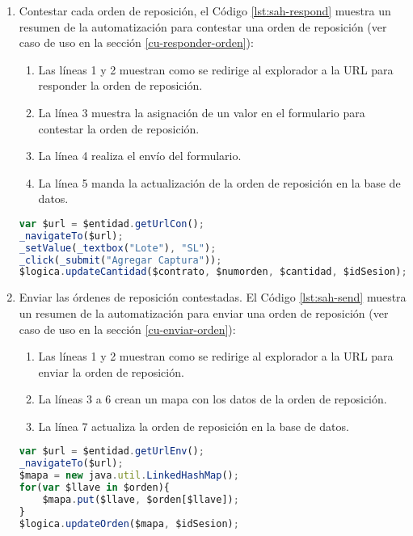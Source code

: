 \begin{enumerate}
	\item Contestar cada orden de reposición, el Código \ref{lst:sah-respond} muestra un resumen de la automatización para contestar una orden de reposición (ver caso de uso en la sección \ref{cu-responder-orden}):
	\begin{enumerate}
		\item Las líneas 1 y 2 muestran como se redirige al explorador a la URL para responder la orden de reposición.
		\item  La línea 3 muestra la asignación de un valor en el formulario para contestar la orden de reposición.
		\item La línea 4 realiza el envío del formulario.
		\item La línea 5 manda la actualización de la orden de reposición en la base de datos.
	\end{enumerate}
	\begin{lstlisting}[language=Javascript, caption={Responder orden de reposición.}, captionpos=b, label={lst:sah-respond}]
var $url = $entidad.getUrlCon();
_navigateTo($url);
_setValue(_textbox("Lote"), "SL");
_click(_submit("Agregar Captura"));
$logica.updateCantidad($contrato, $numorden, $cantidad, $idSesion);
	\end{lstlisting}

	\item Enviar las órdenes de reposición contestadas. El Código \ref{lst:sah-send} muestra un resumen de la automatización para enviar una orden de reposición (ver caso de uso en la sección \ref{cu-enviar-orden}):
	\begin{enumerate}
		\item Las líneas 1 y 2 muestran como se redirige al explorador a la URL para enviar la orden de reposición.
		\item La líneas 3 a 6 crean un mapa con los datos de la orden de reposición.
		\item La línea 7 actualiza la orden de reposición en la base de datos. 
	\end{enumerate}
	\begin{lstlisting}[language=Javascript, caption={Enviar orden de reposición.}, captionpos=b, label={lst:sah-send}]
var $url = $entidad.getUrlEnv();
_navigateTo($url);
$mapa = new java.util.LinkedHashMap();
for(var $llave in $orden){
	$mapa.put($llave, $orden[$llave]);
}
$logica.updateOrden($mapa, $idSesion);
	\end{lstlisting}
\end{enumerate}

